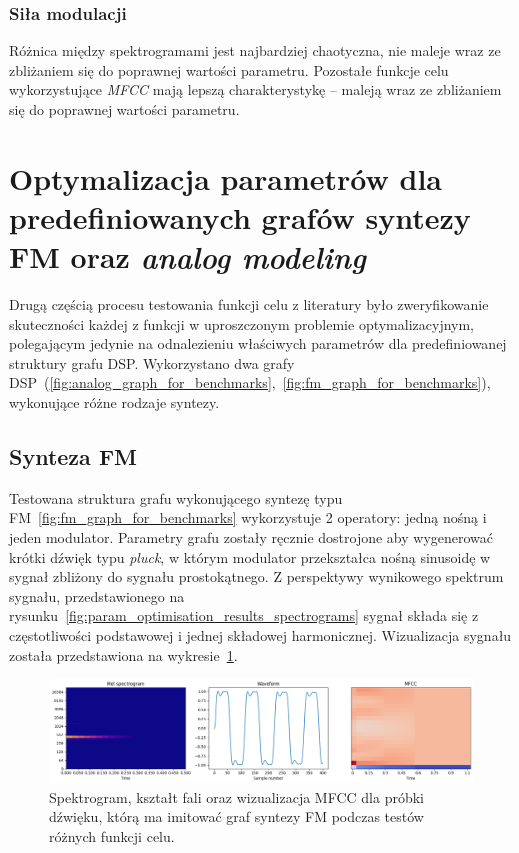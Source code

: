 \subsubsection{Siła modulacji}

Różnica między spektrogramami jest najbardziej chaotyczna, nie maleje wraz
ze zbliżaniem się do poprawnej wartości parametru. Pozostałe funkcje celu
wykorzystujące \textit{MFCC} mają lepszą charakterystykę -- maleją
wraz ze zbliżaniem się do poprawnej wartości parametru.

\section{Optymalizacja parametrów dla predefiniowanych
grafów syntezy FM oraz \textit{analog modeling}}

Drugą częścią procesu testowania funkcji celu z literatury było zweryfikowanie skuteczności
każdej z funkcji w uproszczonym problemie optymalizacyjnym, polegającym jedynie na odnalezieniu właściwych
parametrów dla predefiniowanej struktury grafu DSP\@. Wykorzystano dwa grafy
DSP~(\ref{fig:analog_graph_for_benchmarks},~\ref{fig:fm_graph_for_benchmarks}),
wykonujące różne rodzaje syntezy.

\subsection{Synteza FM}

Testowana struktura grafu wykonującego syntezę typu FM~\ref{fig:fm_graph_for_benchmarks}
wykorzystuje 2 operatory: jedną nośną
i jeden modulator. Parametry grafu zostały ręcznie dostrojone aby wygenerować krótki
dźwięk typu \textit{pluck}, w którym modulator przekształca nośną sinusoidę w sygnał zbliżony
do sygnału prostokątnego. Z perspektywy wynikowego spektrum sygnału, przedstawionego na
rysunku~\ref{fig:param_optimisation_results_spectrograms} sygnał składa się z częstotliwości
podstawowej i jednej składowej harmonicznej. Wizualizacja sygnału została przedstawiona
na wykresie~\ref{fig:fm_training_sample_overview}.

\begin{figure}[H]
    \centering
    \includegraphics[width=1.0\linewidth]{rys03/fm_training_sample_overview.png}
    \caption{
      Spektrogram, kształt fali oraz wizualizacja MFCC dla próbki dźwięku, którą
      ma imitować graf syntezy FM podczas testów różnych funkcji celu.
    }\label{fig:fm_training_sample_overview}
\end{figure}


